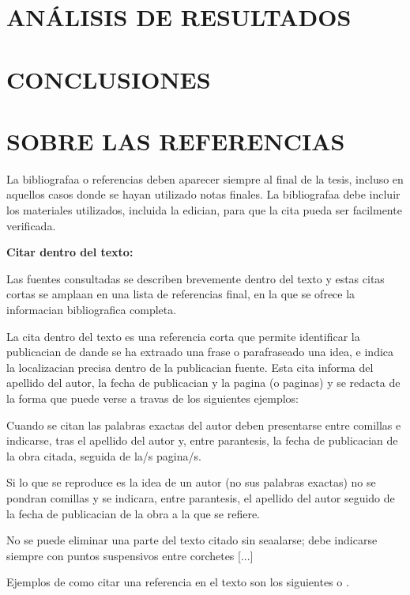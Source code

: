 \documentclass[spanish,12pt, a4paper,twoside]{paper}
\let\oldsection\section
\def\section{\cleardoublepage\oldsection}
\begin{document}
\section{ANÁLISIS DE RESULTADOS}

\section{CONCLUSIONES}

\section{SOBRE LAS REFERENCIAS}

La bibliografaa o referencias deben aparecer siempre al final de la tesis, incluso en aquellos casos donde se hayan utilizado notas finales. La bibliografaa debe incluir los materiales utilizados, incluida la edician, para que la cita pueda ser facilmente verificada. 

\bigskip
{\bf Citar dentro del texto:}

Las fuentes consultadas se describen brevemente dentro del texto y estas citas cortas se amplaan en una lista de referencias final, en la que se ofrece la informacian bibliografica completa. 

La cita dentro del texto es una referencia corta que permite identificar la publicacian de dande se ha extraado una frase o parafraseado una idea, e indica la localizacian precisa dentro de la publicacian fuente. Esta cita informa del apellido del autor, la fecha de publicacian y la pagina (o paginas) y se redacta de la forma que puede verse a travas de los siguientes ejemplos:

Cuando se citan las palabras exactas del autor deben presentarse entre comillas e indicarse, tras el apellido del autor y, entre parantesis, la fecha de publicacian de la obra citada, seguida de la/s pagina/s.

Si lo que se reproduce es la idea de un autor (no sus palabras exactas) no se pondran comillas y se indicara, entre parantesis, el apellido del autor seguido de la fecha de publicacian de la obra a la que se refiere.

No se puede eliminar una parte del texto citado sin seaalarse; debe indicarse siempre con puntos suspensivos entre corchetes [...]

Ejemplos de como citar una referencia en el texto son los siguientes \cite{Ashtiani2014} o \cite{Ashtiani2014,Mateos2009,Vicente2016}.
\end{document}
